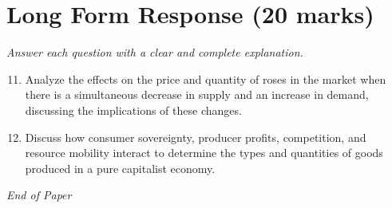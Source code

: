 \documentclass[12pt]{article}
\begin{document}
\section*{Long Form Response (20 marks)}
\textit{Answer each question with a clear and complete explanation.}
\begin{enumerate}[label=\arabic*.]
\setcounter{enumi}{10}
\item Analyze the effects on the price and quantity of roses in the market when there is a
simultaneous decrease in supply and an increase in demand, discussing the implications of
these changes.
\item Discuss how consumer sovereignty, producer profits, competition, and resource mobility
interact to determine the types and quantities of goods produced in a pure capitalist
economy.
\end{enumerate}

\vfill
\noindent\textit{End of Paper}
\end{document}

